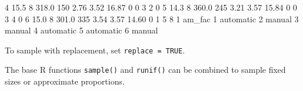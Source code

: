 \documentclass[
]{book}
\newenvironment{Shaded}{\begin{snugshade}}{\end{snugshade}}
\newcommand{\DecValTok}[1]{\textcolor[rgb]{0.00,0.00,0.81}{#1}}
\newcommand{\FloatTok}[1]{\textcolor[rgb]{0.00,0.00,0.81}{#1}}
\newcommand{\NormalTok}[1]{#1}
\begin{document}
\begin{Shaded}
\begin{Highlighting}[]
\DecValTok{4} \FloatTok{15.5}         \DecValTok{8} \FloatTok{318.0} \DecValTok{150}       \FloatTok{2.76}   \FloatTok{3.52} \FloatTok{16.87}      \DecValTok{0}  \DecValTok{0}    \DecValTok{3}    \DecValTok{2}     \DecValTok{0}
\DecValTok{5} \FloatTok{14.3}         \DecValTok{8} \FloatTok{360.0} \DecValTok{245}       \FloatTok{3.21}   \FloatTok{3.57} \FloatTok{15.84}      \DecValTok{0}  \DecValTok{0}    \DecValTok{3}    \DecValTok{4}     \DecValTok{0}
\DecValTok{6} \FloatTok{15.0}         \DecValTok{8} \FloatTok{301.0} \DecValTok{335}       \FloatTok{3.54}   \FloatTok{3.57} \FloatTok{14.60}      \DecValTok{0}  \DecValTok{1}    \DecValTok{5}    \DecValTok{8}     \DecValTok{1}
\NormalTok{     am\_fac}
\DecValTok{1}\NormalTok{ automatic}
\DecValTok{2}\NormalTok{    manual}
\DecValTok{3}\NormalTok{    manual}
\DecValTok{4}\NormalTok{ automatic}
\DecValTok{5}\NormalTok{ automatic}
\DecValTok{6}\NormalTok{    manual}
\end{Highlighting}
\end{Shaded}

To sample with replacement, set \texttt{replace\ =\ TRUE}.

The base R functions \texttt{sample()} and \texttt{runif()} can be combined to sample fixed sizes or approximate proportions.
\end{document}
